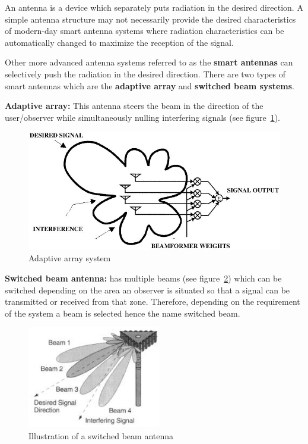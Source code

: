 An antenna is a device which separately puts radiation in the desired direction. A simple antenna structure may not necessarily provide the desired characteristics of modern-day smart antenna systems where radiation characteristics can be automatically changed to maximize the reception of the signal.

Other more advanced antenna systems referred to as the \textbf{smart antennas} can selectively push the radiation in the desired direction. There are two types of smart antennas which are the \textbf{adaptive array} and \textbf{switched beam systems}.

\textbf{Adaptive array:} This antenna steers the beam in the direction of the user/observer while simultaneously nulling interfering signals (see figure~\ref{fig:fh06_02}).
\begin{figure}[h]
\centering
\includegraphics[scale=0.3]{./graphics/fh06_02}
\caption{Adaptive array system}
\label{fig:fh06_02}
\end{figure}

\textbf{Switched beam antenna:} has multiple beams (see figure~\ref{fig:switchedbeam}) which can be switched depending on the area an observer is situated so that a signal can be transmitted or received from that zone. Therefore, depending on the requirement of the system a beam is selected hence the name switched beam.
\begin{figure}[h]
\centering
\includegraphics[scale=0.7]{./graphics/switchedbeam}
\caption{Illustration of a switched beam antenna}
\label{fig:switchedbeam}
\end{figure} 

